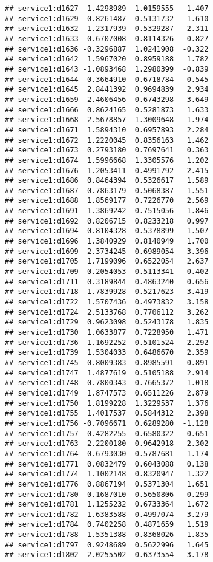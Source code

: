 \documentclass[
]{article}
\begin{document}
\begin{verbatim}
## service1:d1627  1.4298989  1.0159555   1.407
## service1:d1629  0.8261487  0.5131732   1.610
## service1:d1632  1.2317939  0.5329287   2.311
## service1:d1633  0.6707008  0.8114326   0.827
## service1:d1636 -0.3296887  1.0241908  -0.322
## service1:d1642  1.5967020  0.8959188   1.782
## service1:d1643 -1.0893468  1.2980399  -0.839
## service1:d1644  0.3664910  0.6718784   0.545
## service1:d1645  2.8441392  0.9694839   2.934
## service1:d1659  2.4606456  0.6743298   3.649
## service1:d1666  0.8624165  0.5281873   1.633
## service1:d1668  2.5678857  1.3009648   1.974
## service1:d1671  1.5894310  0.6957893   2.284
## service1:d1672  1.2220045  0.8356163   1.462
## service1:d1673  0.2793180  0.7697641   0.363
## service1:d1674  1.5996668  1.3305576   1.202
## service1:d1676  1.2053411  0.4991792   2.415
## service1:d1686  0.8464394  0.5326617   1.589
## service1:d1687  0.7863179  0.5068387   1.551
## service1:d1688  1.8569177  0.7226770   2.569
## service1:d1691  1.3869242  0.7515056   1.846
## service1:d1692  0.8206715  0.8233218   0.997
## service1:d1694  0.8104328  0.5378899   1.507
## service1:d1696  1.3840929  0.8140949   1.700
## service1:d1699  2.3734245  0.6989054   3.396
## service1:d1705  1.7199096  0.6522054   2.637
## service1:d1709  0.2054053  0.5113341   0.402
## service1:d1711  0.3189844  0.4863240   0.656
## service1:d1718  1.7839928  0.5217623   3.419
## service1:d1722  1.5707436  0.4973832   3.158
## service1:d1724  2.5133768  0.7706112   3.262
## service1:d1729  0.9623098  0.5243178   1.835
## service1:d1730  1.0633877  0.7228950   1.471
## service1:d1736  1.1692252  0.5101524   2.292
## service1:d1739  1.5304033  0.6486670   2.359
## service1:d1745  0.8009383  0.8985591   0.891
## service1:d1747  1.4877619  0.5105188   2.914
## service1:d1748  0.7800343  0.7665372   1.018
## service1:d1749  1.8747573  0.6511226   2.879
## service1:d1750  1.8199228  1.3229537   1.376
## service1:d1755  1.4017537  0.5844312   2.398
## service1:d1756 -0.7096671  0.6289280  -1.128
## service1:d1757  0.4282255  0.6580322   0.651
## service1:d1763  2.2200180  0.9642918   2.302
## service1:d1764  0.6793030  0.5787681   1.174
## service1:d1771  0.0832479  0.6043088   0.138
## service1:d1774  1.1002148  0.8320947   1.322
## service1:d1776  0.8867194  0.5371304   1.651
## service1:d1780  0.1687010  0.5650806   0.299
## service1:d1781  1.1255232  0.6733364   1.672
## service1:d1782  1.6383588  0.4997074   3.279
## service1:d1784  0.7402258  0.4871659   1.519
## service1:d1788  1.5351388  0.8368026   1.835
## service1:d1797  0.9248689  0.5622996   1.645
## service1:d1802  2.0255502  0.6373554   3.178

\end{verbatim}
\end{document}
